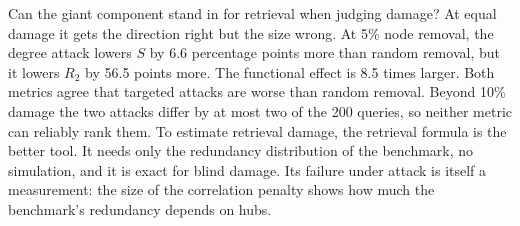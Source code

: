 Can the giant component stand in for retrieval when judging damage? At equal
damage it gets the direction right but the size wrong. At 5\% node removal, the
degree attack lowers $S$ by 6.6 percentage points more than random removal,
but it lowers $R_2$ by 56.5 points more. The functional effect is 8.5 times
larger. Both metrics agree that targeted attacks are worse than random
removal. Beyond 10\% damage the two attacks differ by at most two of the 200
queries, so neither metric can reliably rank them. To estimate retrieval
damage, the retrieval formula is the better tool. It needs only the redundancy
distribution of the benchmark, no simulation, and it is exact for blind damage.
Its failure under attack is itself a measurement: the size of the correlation
penalty shows how much the benchmark's redundancy depends on hubs.
